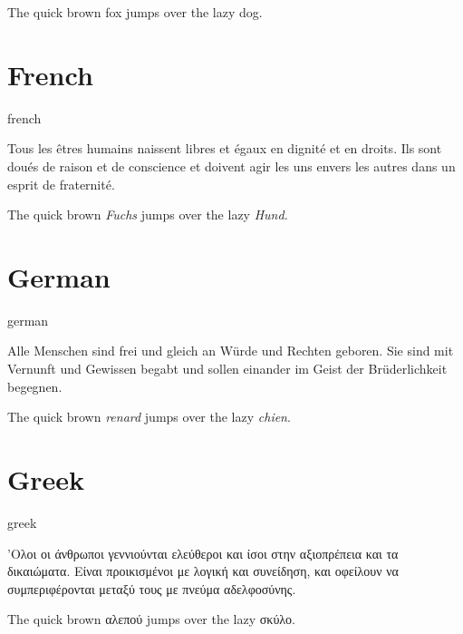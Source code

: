 \documentclass[11pt, a4paper]{article}
\begin{document}
		The quick brown fox jumps over the lazy dog.

	\section{French}

		\begin{selectlanguage}{french}
			\begin{displayquote}
				Tous les êtres humains naissent libres et égaux en dignité et en droits. Ils sont doués de raison et de conscience et doivent agir les uns envers les autres dans un esprit de fraternité.
			\end{displayquote}
		\end{selectlanguage}

		The quick brown \textit{\foreignlanguage{french}{Fuchs}} jumps over the lazy \textit{\foreignlanguage{french}{Hund}}.

	\section{German}

		\begin{selectlanguage}{german}
			\begin{displayquote}
				Alle Menschen sind frei und gleich an Würde und Rechten geboren. Sie sind mit Vernunft und Gewissen begabt und sollen einander im Geist der Brüderlichkeit begegnen.
			\end{displayquote}
		\end{selectlanguage}

		The quick brown \textit{\foreignlanguage{german}{renard}} jumps over the lazy \textit{\foreignlanguage{german}{chien}}.

	\section{Greek}

		\begin{selectlanguage}{greek}
			\begin{displayquote}
				'Ολοι οι άνθρωποι γεννιούνται ελεύθεροι και ίσοι στην αξιοπρέπεια και τα δικαιώματα. Είναι προικισμένοι με λογική και συνείδηση, και οφείλουν να συμπεριφέρονται μεταξύ τους με πνεύμα αδελφοσύνης.
			\end{displayquote}
		\end{selectlanguage}

		The quick brown \foreignlanguage{greek}{αλεπού} jumps over the lazy \foreignlanguage{greek}{σκύλο}.
\end{document}
